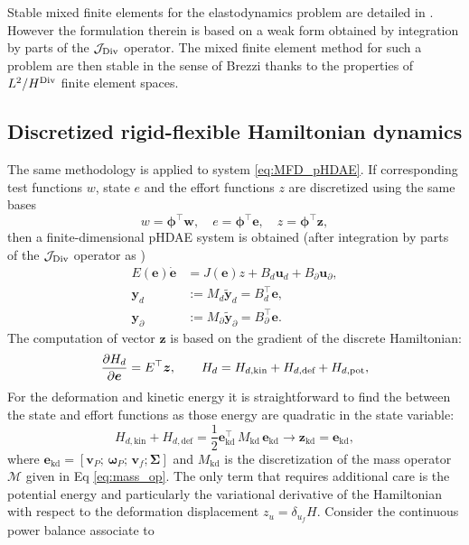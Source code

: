\begin{remark}
Stable mixed finite elements for the elastodynamics problem are detailed in \cite{ArnoldElasDyn}. However the formulation therein is based on a weak form obtained by integration by parts of the $\mathcal{J}_{\operatorname*{Div}}$ operator. The mixed finite element method for such a problem are then stable in the sense of Brezzi thanks to the properties of $L^2 / H^{\operatorname*{Div}}$ finite element spaces.
\end{remark}

\subsection{Discretized rigid-flexible Hamiltonian dynamics}

The same methodology is applied to system \eqref{eq:MFD_pHDAE}. If corresponding test functions $w$, state $e$ and the effort functions $z$ are discretized using the same bases
\[ w = \bm{\phi}^\top \bm{w}, \quad e = \bm{\phi}^\top \bm{e}, \quad z = \bm{\phi}^\top \bm{z},
\]
then a finite-dimensional pHDAE system is obtained (after integration by parts of the $\mathcal{J}_{\operatorname*{Div}}$ operator as )
\begin{equation}
	\begin{aligned}
	{E}(\bm{e}) \dot{\bm{e}} &= {J(\bm{e}) z} + {B}_d \bm{u}_d + {B}_\partial \bm{u}_\partial, \\
	\bm{y}_d &:= {M}_d \widetilde{\bm{y}}_d = {B}_d^\top \bm{e},  \\
	\bm{y}_\partial &:= {M}_\partial \widetilde{\bm{y}}_\partial = {B}_\partial^\top \bm{e}.
	\end{aligned}
\end{equation}
The computation of vector $\bm{z}$ is based on the gradient of the discrete Hamiltonian:
\[
\diffp{H_d}{\bm{e}} = {E}^\top \bm{z}, \qquad H_d = H_{d, \text{kin}}+H_{d, \text{def}}+H_{d, \text{pot}},
\]
For the deformation and kinetic energy it is straightforward to find the between the state and effort functions as those energy are quadratic in the state variable:
\begin{equation}
H_{d, \text{kin}} + H_{d, \text{def}} = \frac{1}{2} \bm{e}_{\text{kd}}^\top \, {M}_{\text{kd}} \, \bm{e}_{\text{kd}} \longrightarrow \bm{z}_{\text{kd}} = \bm{e}_{\text{kd}},
\end{equation}
where $\bm{e}_{\text{kd}} = [\bm{v}_P; \, \bm{\omega}_P; \, \bm{v}_f; \bm{\Sigma}]$ and ${M}_{\text{kd}}$ is the discretization of the mass operator $\mathcal{M}$ given in Eq \eqref{eq:mass_op}. 
The only term that requires additional care is the potential energy and particularly the variational derivative of the Hamiltonian with respect to the deformation displacement $z_{u}=\delta_{u_f} H$.  Consider the continuous power balance associate to
